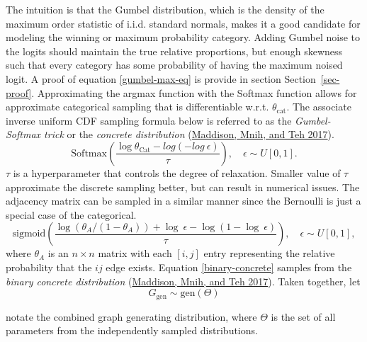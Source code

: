 \documentclass[
  11pt,
  letterpaper,
]{article}
\begin{document}
The intuition is that the Gumbel distribution, which is the density of
the maximum order statistic of i.i.d. standard normals, makes it a good
candidate for modeling the winning or maximum probability category.
Adding Gumbel noise to the logits should maintain the true relative
proportions, but enough skewness such that every category has some
probability of having the maximum noised logit. A proof of equation
\ref{gumbel-max-eq} is provide in section Section~\ref{sec-proof}.
Approximating the argmax function with the Softmax function allows for
approximate categorical sampling that is differentiable w.r.t.
\(\theta_\text{cat}\). The associate inverse uniform CDF sampling
formula below is referred to as the \emph{Gumbel-Softmax trick} or the
\emph{concrete distribution}
(\protect\hyperlink{ref-Maddison_Mnih_Teh_2017}{Maddison, Mnih, and Teh
2017}). \begin{equation}
    \text{Softmax}
    \left(
        \dfrac{\log \theta_{\text{Cat}} - log(-log \ \epsilon)}{\tau}
    \right), \quad \epsilon \sim U[0, 1].
\end{equation} \(\tau\) is a hyperparameter that controls the degree of
relaxation. Smaller value of \(\tau\) approximate the discrete sampling
better, but can result in numerical issues. The adjacency matrix can be
sampled in a similar manner since the Bernoulli is just a special case
of the categorical.\\
\begin{equation} \label{binary-concrete}
        \text{sigmoid}
            \left(\dfrac{\log(\theta_A / (1 - \theta_A)) + \log \ \epsilon - \log(1 - \log \ \epsilon)}{\tau} \right), \quad \epsilon \sim U[0, 1], 
    \end{equation} where \(\theta_A\) is an \(n \times n\) matrix with
each \([i, j]\) entry representing the relative probability that the
\(ij\) edge exists. Equation \ref{binary-concrete} samples from the
\emph{binary concrete distribution}
(\protect\hyperlink{ref-Maddison_Mnih_Teh_2017}{Maddison, Mnih, and Teh
2017}). Taken together, let\\
\[
    G_{\text{gen}} \sim \text{gen}(\Theta)  
\]

notate the combined graph generating distribution, where \(\Theta\) is
the set of all parameters from the independently sampled distributions.
\end{document}
